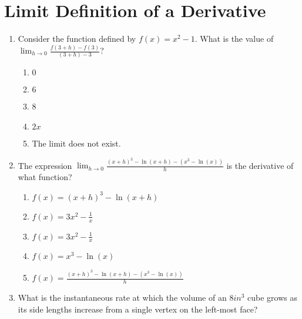 \documentclass[12pt]{report}
\begin{document}
\newcommand{\less}{\textless}
\newcommand{\greater}{\textgreater}
\newcommand{\reals}{\mathbb{R}}
\newcommand{\integers}{\mathbb{Z}}
\newcommand{\rationals}{\mathbb{Q}}
\newcommand{\dsp}{\displaystyle}

\section*{Limit Definition of a Derivative}

\begin{enumerate}

\item Consider the function defined by $f(x) = x^2 - 1$. What is the value of $ \lim_{h \to 0}\frac{f(3+h)-f(3)}{(3+h)-3}$?

\begin{enumerate}

\item $0$

\item $6$

\item 8

\item $2x$

\item The limit does not exist.

\end{enumerate}

\item The expression $\lim_{h \to 0}\frac{(x+h)^3-\ln(x+h) - \left(x^3-\ln(x)\right)}{h}$ is the derivative of what function?

\begin{enumerate}

\item $f(x) = (x+h)^3-\ln(x+h)$

\item $f(x) = 3x^2 - \frac{1}{x}$

\item $f(x) = 3x^2 - \frac{1}{x}$

\item $f(x) = x^3 - \ln(x)$

\item $f(x) = \frac{(x+h)^3-\ln(x+h) - \left(x^3-\ln(x)\right)}{h}$

\end{enumerate}

\item What is the instantaneous rate at which the volume of an $8in^3$ cube grows as its side lengths increase from a single vertex on the left-most face?



\end{enumerate}
\end{document}
